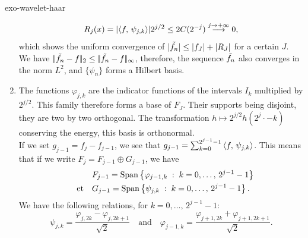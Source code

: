 \begin{correction}{exo-wavelet-haar}
\begin{enumerate}
\begin{equation*}
R_j (x) = | \langle f,\,\psi_{j, k}\rangle | 2^{j/2} \leq 2 C (2^{- j}) \overset{j \to +\infty}{\longrightarrow} 0,
\end{equation*}
which shows the uniform convergence of $ | \tilde{f_n} | \leq | f_J | + | R_J | $ for a certain $ J $. \\We have $ |\!| \tilde{f_n} -f |\!|_2 \leq |\!| \tilde{f_n} -f |\!|_\infty $, therefore, the sequence $ \tilde{f_n} $ also converges in the norm $ L^2 $, and $ \{\psi_n\} $ forms a Hilbert basis.
\item The functions $ \varphi_{j, k} $ are the indicator functions of the intervals $ I_k $ multiplied by $ 2^{j/2} $. This family therefore forms a base of $ F_J $. Their supports being disjoint, they are two by two orthogonal. The transformation $ h \mapsto 2^{j/2} h (2^j \cdot - k) $ conserving the energy, this basis is orthonormal. \\If we set $ g_{j-1} = f_j - f_{j-1} $, we see that $ g_{j-1} = \sum_{k = 0}^{2^{j-1} -1}{\langle f,\,\psi_{j, k}\rangle} $. This means that if we write $ F_j = F_{j-1} \oplus G_{j-1} $, we have
\begin{align*}
& F_{j-1} = \operatorname{Span} \left\{ \varphi_{j-1, k} \;:\; k = 0, \ldots, \, 2^{j-1} -1 \right\} \\
\quad \text{et} \quad & G_{j-1} = \operatorname{Span} \left\{ \psi_{j, k} \;:\; k = 0, \ldots, \, 2^{j-1} -1 \right\}.
\end{align*}
We have the following relations, for $ k = 0, \ldots, \, 2^{j-1} -1 $:
\begin{equation}
\label{eqn-recurrence-wavelets-haar}
\psi_{j, k} = \frac{\varphi_{j, 2k} - \varphi_{j, 2k+1}}{\sqrt{2}} \quad \text{and} \quad \varphi_{j- 1, k} = \frac{\varphi_{j+1,2k} + \varphi_{j+1,2k+1}}{\sqrt{2}}.
\end{equation}
 

\end{enumerate}
\end{correction}
